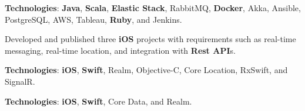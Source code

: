 \documentclass[letterpaper]{deedy-resume} %
\begin{document}
\begin{minipage}[t]{0.64\textwidth}
\vspace{0.5mm}

\textbf{Technologies}: \textbf{Java}, \textbf{Scala}, \textbf{Elastic Stack}, RabbitMQ, \textbf{Docker}, Akka, Ansible, PostgreSQL, AWS, Tableau, \textbf{Ruby}, and Jenkins.


\vspace{4.5mm}


Developed and published three \textbf{iOS} projects with requirements such as real-time messaging, real-time location, and integration with \textbf{Rest API}s.

\vspace{0.5mm}

\textbf{Technologies}: \textbf{iOS}, \textbf{Swift}, Realm, Objective-C, Core Location, RxSwift, and SignalR.


\vspace{4.5mm}



\vspace{0.5mm}

\textbf{Technologies}: \textbf{iOS}, \textbf{Swift}, Core Data, and Realm.

\vspace{4.5mm}

\vspace{0.5mm}


\end{minipage}
\end{document}
